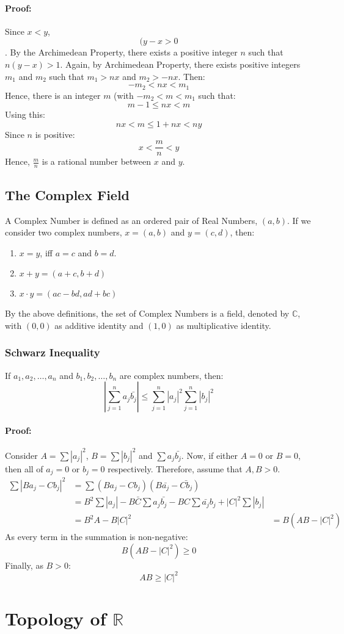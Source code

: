 \documentclass[12pt, oneside]{book}
\begin{document}
\paragraph{Proof:} Since \(x<y\), \[(y-x > 0\].
By the Archimedean Property, there exists a positive integer \(n\) such that \(n(y-x) > 1\).
Again, by Archimedean Property, there exists positive integers \(m_1\) and \(m_2\) such that \(m_1 > nx\) and \(m_2 > -nx\).
Then: \[ -m_2 < nx < m_1 \]
Hence, there is an integer \(m\) (with \( -m_2 < m < m_1 \) such that:
\[ m-1 \leq nx < m \]
Using this:
\[ nx < m \leq 1+nx <ny \]
Since \(n\) is positive:
\[ x < \frac{m}{n} < y \]
Hence, \(\frac{m}{n}\) is a rational number between \(x\) and \(y\).

\subsection{The Complex Field}
A Complex Number is defined as an ordered pair of Real Numbers, \((a,b)\).
If we consider two complex numbers, \(x=(a,b)\) and \(y=(c,d)\), then:
\begin{enumerate}
	\item \(x = y\), iff \(a=c\) and \(b=d\).
	\item \(x+y = (a+c,b+d)\)
	\item \(x \cdot y = (ac-bd,ad+bc)\)
\end{enumerate}
By the above definitions, the set of Complex Numbers is a field, denoted by \(\mathbb{C}\), with \((0,0)\) as additive identity and \((1,0)\) as multiplicative identity.

\subsubsection{Schwarz Inequality}
If \( a_1, a_2, \dots, a_n \) and \( b_1, b_2, \dots, b_n \) are complex numbers, then:
\[ \left| \sum_{j=1}^{n} a_j \bar{b_j} \right| \leq \sum_{j=1}^{n} \left|a_j\right|^2 \sum_{j=1}^{n} \left|b_j\right|^2 \]

\paragraph{Proof:} Consider \(A = \sum |a_j|^2 \), \(B = \sum |b_j|^2\) and \(\sum a_j \bar{b_j}\).
Now, if either \(A=0\) or \(B=0\), then all of \(a_j=0\) or \(b_j=0\) respectively.
Therefore, assume that \(A,B>0\).
\begin{align*}
	\sum \left| Ba_j - Cb_j \right|^2 & = \sum \left( Ba_j - Cb_j \right)\left( B \bar{a_j} - \bar{Cb_j} \right)                                                   \\
	                                  & = B^2 \sum \left|a_j\right| - B\bar{C} \sum a_j \bar{b_j} - BC \sum \bar{a_j} b_j + \left|C\right|^2 \sum \left|b_j\right| \\
	                                  & = B^2 A - B\left|C\right|^2
	                                  & = B\left(AB - \left|C\right|^2\right)
\end{align*}
As every term in the summation is non-negative:
\[B\left(AB - |C|^2\right) \geq 0\]
Finally, as \(B>0\):
\[ AB \geq |C|^2\]

\section{Topology of \(\mathbb{R}\)}
\end{document}
